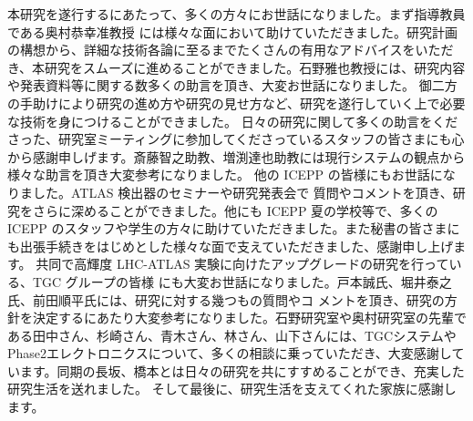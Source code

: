 

本研究を遂行するにあたって、多くの方々にお世話になりました。まず指導教員である奥村恭幸准教授 には様々な面において助けていただきました。研究計画の構想から、詳細な技術各論に至るまでたくさんの有用なアドバイスをいただき、本研究をスムーズに進めることができました。石野雅也教授には、研究内容や発表資料等に関する数多くの助言を頂き、大変お世話になりました。
御二方の手助けにより研究の進め方や研究の見せ方など、研究を遂行していく上で必要な技術を身につけることができました。
日々の研究に関して多くの助言をくださった、研究室ミーティングに参加してくださっているスタッフの皆さまにも心から感謝申しげます。斎藤智之助教、増渕達也助教には現行システムの観点から様々な助言を頂き大変参考になりました。
他の ICEPP の皆様にもお世話になりました。ATLAS 検出器のセミナーや研究発表会で 質問やコメントを頂き、研究をさらに深めることができました。他にも ICEPP 夏の学校等で、多くの ICEPP のスタッフや学生の方々に助けていただきました。また秘書の皆さまにも出張手続きをはじめとした様々な面で支えていただきました、感謝申し上げます。
共同で高輝度 LHC-ATLAS 実験に向けたアップグレードの研究を行っている、TGC グループの皆様 にも大変お世話になりました。戸本誠氏、堀井泰之氏、前田順平氏には、研究に対する幾つもの質問やコ メントを頂き、研究の方針を決定するにあたり大変参考になりました。石野研究室や奥村研究室の先輩である田中さん、杉崎さん、青木さん、林さん、山下さんには、TGCシステムやPhase2エレクトロニクスについて、多くの相談に乗っていただき、大変感謝しています。同期の長坂、橋本とは日々の研究を共にすすめることができ、充実した研究生活を送れました。
そして最後に、研究生活を支えてくれた家族に感謝します。